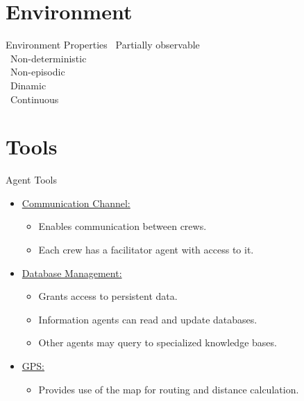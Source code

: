 \documentclass{beamer}
\begin{document}
\section{Environment}
\begin{frame}{Environment Properties}
            \vspace{0.5em}
               \faEye\ Partially observable\\
\vspace{0.5em}
               \faQuestionCircle\ Non-deterministic\\
\vspace{0.5em}
              \faLink\ Non-episodic\\
\vspace{0.5em}
            \faRefresh\ Dinamic\\
\vspace{0.5em}
                \faMapMarker\ Continuous\\
\vspace{0.5em}
\end{frame}

\section{Tools}
\begin{frame}{Agent Tools}
    \begin{itemize}
        \item \underline{Communication Channel:}
        \begin{itemize}
            \item Enables \alert{communication} between crews.
            \item Each crew has a \alert{facilitator} agent with access to it.
        \end{itemize}
        \item \underline{Database Management:}
        \begin{itemize}
            \item Grants access to \alert{persistent} data.
            \item \alert{Information} agents can read and update databases.
            \item Other agents may query to \alert{specialized knowledge} bases.
        \end{itemize}
        \item \underline{GPS:}
        \begin{itemize}
            \item Provides use of the map for \alert{routing} and \alert{distance calculation}.
        \end{itemize}
    \end{itemize}
\end{frame}
\end{document}
